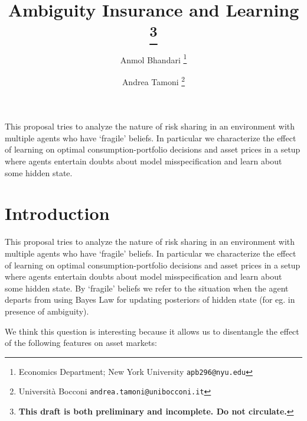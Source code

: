 \documentclass[a4paper,12pt]{article}
\begin{document}
\title{Ambiguity Insurance and Learning \thanks{\textbf{This draft is both preliminary and incomplete. Do not circulate.}}}
\author{Anmol Bhandari \thanks{Economics Department; New York University \texttt{apb296@nyu.edu}} \and {Andrea Tamoni} \thanks{ Universit\`{a} Bocconi \texttt{andrea.tamoni@unibocconi.it}}}
\maketitle

This proposal tries to analyze the nature of risk sharing in an environment with multiple agents who have `fragile' beliefs. In particular we characterize the effect of learning on optimal consumption-portfolio decisions and asset prices in a setup where agents entertain doubts about model misspecification and learn about some hidden state.
\newpage






\setcounter{page}{1}
\pagestyle{plain}


\section{Introduction}
\noindent This proposal tries to analyze the nature of risk sharing in an environment with multiple agents who have `fragile' beliefs.  In particular we characterize the effect of learning on optimal consumption-portfolio decisions and asset prices in a setup where agents entertain doubts about model misspecification and learn about some hidden state. By `fragile' beliefs we refer to the situation when the agent departs from using Bayes Law for updating posteriors of hidden state (for eg. in presence of ambiguity).

\noindent We think this question is interesting because it allows us to disentangle the effect of the following features on asset markets:
\end{document}
